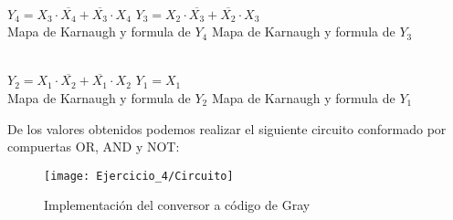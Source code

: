 \begin{center}
	\begin{Karnaugh}
    \end{Karnaugh}
    \begin{Karnaugh}
    \end{Karnaugh}\\
    $Y_4=X_3 \cdot \overline{X_4}+\overline{X_3} \cdot X_4$
    \hspace{28mm}
    $Y_3=X_2 \cdot \overline{X_3}+\overline{X_2} \cdot X_3$\\
    Mapa de Karnaugh y formula de $Y_4$
    \hspace{6mm}
    Mapa de Karnaugh y formula de $Y_3$\\
\end{center}
\medskip
\begin{center}
	\begin{Karnaugh}
    \end{Karnaugh}
    \begin{Karnaugh}
    \end{Karnaugh}\\
    $Y_2=X_1 \cdot \overline{X_2}+\overline{X_1} \cdot X_2$
    \hspace{28mm}
    $Y_1=X_1$\\
    Mapa de Karnaugh y formula de $Y_2$
    \hspace{6mm}
    Mapa de Karnaugh y formula de $Y_1$\\
\end{center}
De los valores obtenidos podemos realizar el siguiente circuito conformado por compuertas OR, AND y NOT:\\
\begin{figure}[H]
	\centering
    \texttt{[image: Ejercicio\_4/Circuito]}
    \caption{Implementación del conversor a código de Gray}
\end{figure}